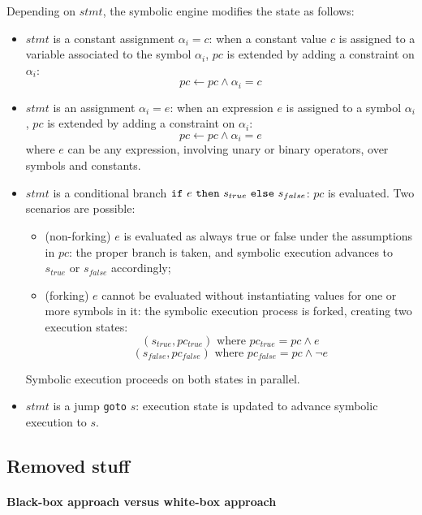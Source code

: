 \noindent Depending on $stmt$, the symbolic engine modifies the state as follows:
\begin{itemize}
  \item $stmt$ is a constant assignment $\alpha_i = c$: when a constant value $c$ is assigned to a variable associated to the symbol $\alpha_i$, $pc$ is extended by adding a constraint on $\alpha_i$:
    \[ pc \gets pc \wedge \alpha_i = c\]

  \item $stmt$ is an assignment $\alpha_i = e$: when an expression $e$ is assigned to a symbol $\alpha_i$, $pc$ is extended by adding a constraint on $\alpha_i$:
    \[ pc \gets pc \wedge \alpha_i = e\]
  where $e$ can be any expression, involving unary or binary operators, over symbols and constants.

  \item $stmt $ is a conditional branch ${\tt if}~e~{\tt then}~s_{true}~{\tt else}~s_{false}$: $pc$ is evaluated. Two scenarios are possible:
    \begin{itemize}
      \item (non-forking) $e$ is evaluated as always true or false under the assumptions in $pc$: the proper branch is taken, and symbolic execution advances to $s_{true}$ or $s_{false}$ accordingly;
      \item (forking) $e$ cannot be evaluated without instantiating values for one or more symbols in it: the symbolic execution process is forked, creating two execution states:
        \[ (s_{true}, pc_{true}) \text{ where } pc_{true} = pc \wedge e \]
        \[ (s_{false}, pc_{false}) \text{ where } pc_{false} = pc \wedge \neg e \]
    \end{itemize}
    Symbolic execution proceeds on both states in parallel.

  \item $stmt $ is a jump {\tt goto} $s$: execution state is updated to advance symbolic execution to $s$. 
\end{itemize}





\subsection{Removed stuff}

\paragraph{Black-box approach versus white-box approach}

